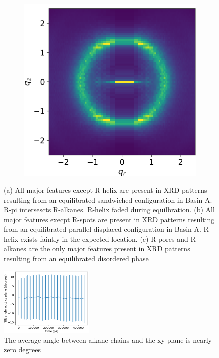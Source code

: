 \documentclass{article}
\begin{document}
\begin{figure}[H]
\begin{subfigure}{0.31\textwidth}
		\caption{}\label{fig:offsetrzplot}
	\end{subfigure}
	\begin{subfigure}{0.31\textwidth}
		\centering
		\hspace{-0.9cm}
		\includegraphics[width=\textwidth]{disorder_rzplot.png}
		\caption{}\label{fig:disorder_rzplot.png}
	\end{subfigure}
	\caption{(a) All major features except R-helix are present in
	XRD patterns resulting from an equilibrated sandwiched configuration 
	in Basin A. R-pi intersescts R-alkanes. R-helix faded during equilbration.
	(b) All major features execpt R-spots are present in XRD patterns 
	resulting from an equilibrated parallel displaced configuration in Basin A.
	R-helix exists faintly in the expected location. (c) R-pores and R-alkanes
	are the only major features present in XRD patterns resulting from an 
	equilibrated disordered phase}\label{fig:XRDsim}
  \end{figure}

  \begin{figure}
        \centering
        \includegraphics[width=0.4\textwidth]{tilt.png}
        \caption{The average angle between alkane chains and the xy plane is nearly zero degrees}\label{fig:tilt}
  \end{figure}
  
\end{document}
